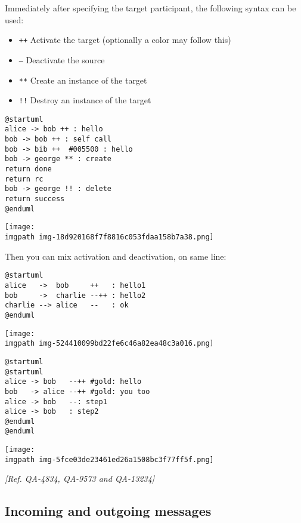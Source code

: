 Immediately after specifying the target participant, the following syntax can be used:


\begin{itemize}
\item \texttt{++} Activate the target (optionally a color may follow this)
\item \texttt{--} Deactivate the source
\item \texttt{**} Create an instance of the target
\item \texttt{!!} Destroy an instance of the target
\end{itemize}


\begin{verbatim}
@startuml
alice -> bob ++ : hello
bob -> bob ++ : self call
bob -> bib ++  #005500 : hello
bob -> george ** : create
return done
return rc
bob -> george !! : delete
return success
@enduml
\end{verbatim}
\begin{center}
\texttt{[image: \\imgpath img-18d920168f7f8816c053fdaa158b7a38.png]}
\end{center}


Then you can mix activation and deactivation, on same line:
\begin{verbatim}
@startuml
alice   ->  bob     ++   : hello1
bob     ->  charlie --++ : hello2
charlie --> alice   --   : ok
@enduml
\end{verbatim}
\begin{center}
\texttt{[image: \\imgpath img-524410099bd22fe6c46a82ea48c3a016.png]}
\end{center}


\begin{verbatim}
@startuml
@startuml
alice -> bob   --++ #gold: hello
bob   -> alice --++ #gold: you too
alice -> bob   --: step1
alice -> bob   : step2
@enduml
@enduml
\end{verbatim}
\begin{center}
\texttt{[image: \\imgpath img-5fce03de23461ed26a1508bc3f77ff5f.png]}
\end{center}


\textit{[Ref. QA-4834, QA-9573 and QA-13234]}
%
%
\subsection{Incoming and outgoing messages}


